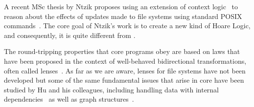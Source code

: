 A recent MSc thesis by Ntzik proposes using an extension of context
logic~\cite{context-logic} to reason about the effects of updates made
to file systems using standard POSIX commands~\cite{ntzik-msc}.  The
core goal of Ntzik's work is to create a new kind of Hoare Logic, and
consequently, it is quite different from \forest{}.  

The round-tripping properties that core \forest{} programs obey are
based on laws that have been proposed in the context of well-behaved
bidirectional transformations, often called lenses~\cite{lenses}. As
far as we are aware, lenses for file systems have not been developed
but some of the same fundamental issues that arise in core \forest{}
have been studied by Hu and his colleagues, including handling data
with internal dependencies~\cite{MuAlgebraic2004} as well as graph
structures~\cite{hidaka-graphs}.
